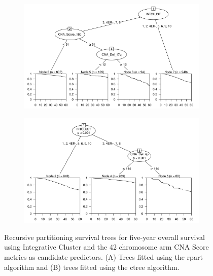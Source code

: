 \begin{figure}[!htb]
\centering

\vspace{0.5cm}

\begin{subfigure}{\textwidth}
\subcaption{}
\includegraphics[width=1\textwidth]{../figures/Appendices/Appendix_B/PA_PartyKit_Survival_Score_FiveYearOS_INTCLUST.png}
\end{subfigure}

\vspace{2cm}

\begin{subfigure}{\textwidth}
\subcaption{}
\includegraphics[width=1\textwidth]{../figures/Appendices/Appendix_B/PA_Ctree_Survival_Score_FiveYearOS_INTCLUST.png}
\end{subfigure}

\vspace{0.5cm}

\caption[Recursive partitioning survival trees for five-year overall survival using Integrative Cluster and the 42 chromosome arm CNA Score metrics as candidate predictors.]{Recursive partitioning survival trees for five-year overall survival using Integrative Cluster and the 42 chromosome arm CNA Score metrics as candidate predictors. (A) Trees fitted using the rpart algorithm and (B) trees fitted using the ctree algorithm.}
\end{figure}



